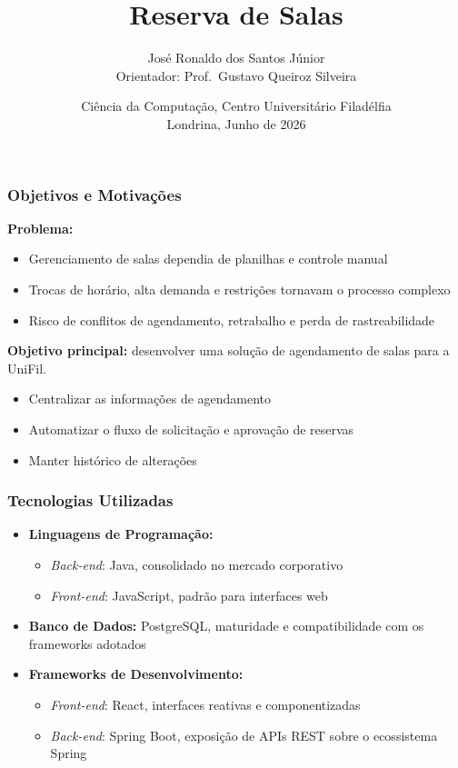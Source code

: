 \documentclass[11pt, xcolor={dvipsnames}, usepdftitle=false]{beamer}
\title{Reserva de Salas}
\author{José Ronaldo dos Santos Júnior\\[2mm]{\small Orientador: Prof.\ Gustavo Queiroz Silveira}}
\date{Ciência da Computação, Centro Universitário Filadélfia\\[1mm]Londrina, Junho de 2026}
\begin{document}
\frame{\titlepage}

\begin{frame}
\frametitle{Objetivos e Motivações}
\textbf{Problema:}
\begin{itemize}
\item Gerenciamento de salas dependia de planilhas e controle manual
\item Trocas de horário, alta demanda e restrições tornavam o processo complexo
\item Risco de conflitos de agendamento, retrabalho e perda de rastreabilidade
\end{itemize}
\vspace{3mm}
\textbf{Objetivo principal:} desenvolver uma solução de agendamento de salas para a UniFil.
\begin{itemize}
\item Centralizar as informações de agendamento
\item Automatizar o fluxo de solicitação e aprovação de reservas
\item Manter histórico de alterações
\end{itemize}
\end{frame}

\begin{frame}
\frametitle{Tecnologias Utilizadas}
\begin{itemize}
\item \textbf{Linguagens de Programação:}
\begin{itemize}
\item \textit{Back-end}: Java, consolidado no mercado corporativo
\item \textit{Front-end}: JavaScript, padrão para interfaces web
\end{itemize}
\item \textbf{Banco de Dados:} PostgreSQL, maturidade e compatibilidade com os frameworks adotados
\item \textbf{Frameworks de Desenvolvimento:}
\begin{itemize}
\item \textit{Front-end}: React, interfaces reativas e componentizadas
\item \textit{Back-end}: Spring Boot, exposição de APIs REST sobre o ecossistema Spring
\end{itemize}
\end{itemize}
\end{frame}

\begin{frame}
\end{frame}
\end{document}
